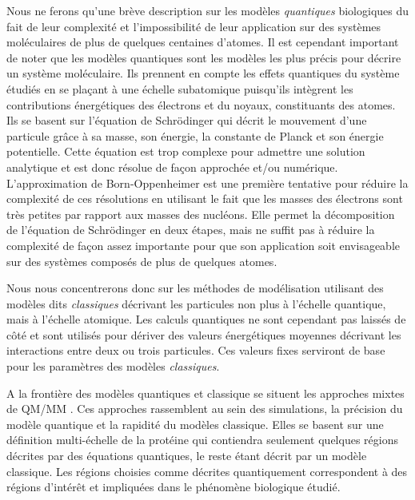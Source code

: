  \label{quantic}

Nous ne ferons qu'une brève description sur les modèles \textit{quantiques} biologiques du fait de leur complexité et l'impossibilité de leur application sur des systèmes moléculaires de plus de quelques centaines d'atomes. Il est cependant important de noter que les modèles quantiques sont les modèles les plus précis pour décrire un système moléculaire. Ils prennent en compte les effets quantiques du système étudiés en se plaçant à une échelle subatomique puisqu'ils intègrent les contributions énergétiques des électrons et du noyaux, constituants des atomes. Ils se basent sur l'équation de Schrödinger \cite{schrodinger1926undulatory} qui décrit le mouvement d'une particule grâce à sa masse, son énergie, la constante de Planck et son énergie potentielle. Cette équation est trop complexe pour admettre une solution analytique et est donc résolue de façon approchée et/ou numérique. L'approximation de Born-Oppenheimer \cite{born1927quantentheorie} est une première tentative pour réduire la complexité de ces résolutions en utilisant le fait que les masses des électrons sont très petites par rapport aux masses des nucléons. Elle permet la décomposition de l'équation de Schrödinger en deux étapes, mais ne suffit pas à réduire la complexité de façon assez importante pour que son application soit envisageable sur des systèmes composés de plus de quelques atomes.

Nous nous concentrerons donc sur les méthodes de modélisation utilisant des modèles dits \textit{classiques} décrivant les particules non plus à l'échelle quantique, mais à l'échelle atomique. Les calculs quantiques ne sont cependant pas laissés de côté et sont utilisés pour dériver des valeurs énergétiques moyennes décrivant les interactions entre deux ou trois particules. Ces valeurs fixes serviront de base pour les paramètres des modèles \textit{classiques}.

A la frontière des modèles quantiques et classique se situent les approches mixtes de QM/MM \cite{warshel1976theoretical}. Ces approches rassemblent au sein des simulations, la précision du modèle quantique et la rapidité du modèles classique. Elles se basent sur une définition multi-échelle de la protéine qui contiendra seulement quelques régions décrites par des équations quantiques, le reste étant décrit par un modèle classique. Les régions choisies comme décrites quantiquement correspondent à des régions d'intérêt et impliquées dans le phénomène biologique étudié.

